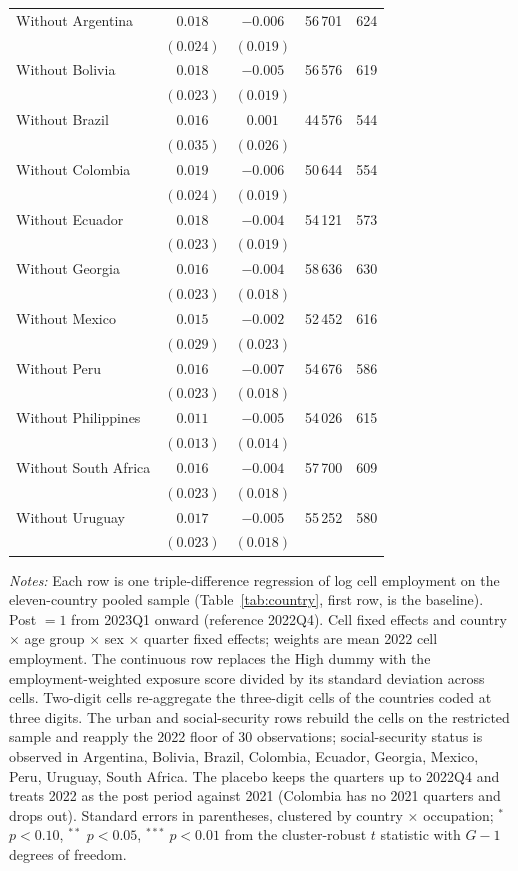 \begin{table}[htbp]
\begin{threeparttable}
\begin{tabular}{lccrr}
Without Argentina & $0.018$ & $-0.006$ & 56\,701 & 624 \\
 & $(0.024)$ & $(0.019)$ &  &  \\
Without Bolivia & $0.018$ & $-0.005$ & 56\,576 & 619 \\
 & $(0.023)$ & $(0.019)$ &  &  \\
Without Brazil & $0.016$ & $0.001$ & 44\,576 & 544 \\
 & $(0.035)$ & $(0.026)$ &  &  \\
Without Colombia & $0.019$ & $-0.006$ & 50\,644 & 554 \\
 & $(0.024)$ & $(0.019)$ &  &  \\
Without Ecuador & $0.018$ & $-0.004$ & 54\,121 & 573 \\
 & $(0.023)$ & $(0.019)$ &  &  \\
Without Georgia & $0.016$ & $-0.004$ & 58\,636 & 630 \\
 & $(0.023)$ & $(0.018)$ &  &  \\
Without Mexico & $0.015$ & $-0.002$ & 52\,452 & 616 \\
 & $(0.029)$ & $(0.023)$ &  &  \\
Without Peru & $0.016$ & $-0.007$ & 54\,676 & 586 \\
 & $(0.023)$ & $(0.018)$ &  &  \\
Without Philippines & $0.011$ & $-0.005$ & 54\,026 & 615 \\
 & $(0.013)$ & $(0.014)$ &  &  \\
Without South Africa & $0.016$ & $-0.004$ & 57\,700 & 609 \\
 & $(0.023)$ & $(0.018)$ &  &  \\
Without Uruguay & $0.017$ & $-0.005$ & 55\,252 & 580 \\
 & $(0.023)$ & $(0.018)$ &  &  \\
\bottomrule
\end{tabular}
\begin{tablenotes}[flushleft]
\footnotesize
\item \textit{Notes:} Each row is one triple-difference regression of log cell employment on the eleven-country pooled sample (Table~\ref{tab:country}, first row, is the baseline). Post $=1$ from 2023Q1 onward (reference 2022Q4). Cell fixed effects and country $\times$ age group $\times$ sex $\times$ quarter fixed effects; weights are mean 2022 cell employment. The continuous row replaces the High dummy with the employment-weighted exposure score divided by its standard deviation across cells. Two-digit cells re-aggregate the three-digit cells of the countries coded at three digits. The urban and social-security rows rebuild the cells on the restricted sample and reapply the 2022 floor of 30 observations; social-security status is observed in Argentina, Bolivia, Brazil, Colombia, Ecuador, Georgia, Mexico, Peru, Uruguay, South Africa. The placebo keeps the quarters up to 2022Q4 and treats 2022 as the post period against 2021 (Colombia has no 2021 quarters and drops out). Standard errors in parentheses, clustered by country $\times$ occupation; $^{*}$ $p<0.10$, $^{**}$ $p<0.05$, $^{***}$ $p<0.01$ from the cluster-robust $t$ statistic with $G-1$ degrees of freedom.

\end{tablenotes}
\end{threeparttable}
\end{table}
